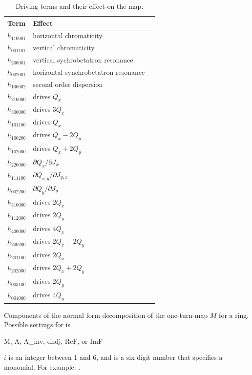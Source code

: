 \begin{description}
{\begin{table}[htb]
\centering
\begin{tabular}{lll}
  \toprule
  Term  & Effect \\
  \midrule
  $h_{110001}$  &  horizontal chromaticity \\
  $h_{001101}$  &  vertical chromaticity   \\
  $h_{200001}$  &  vertical sychrobetatron resonance    \\
  $h_{002001}$  &  horizontal synchrobetatron resonance \\
  $h_{100002}$  &  second order dispersion \\
  $h_{210000}$  &  drives $Q_x$            \\
  $h_{300000}$  &  drives $3Q_x$           \\
  $h_{101100}$  &  drives $Q_x$            \\
  $h_{100200}$  &  drives $Q_x-2Q_y$       \\
  $h_{102000}$  &  drives $Q_x+2Q_y$       \\
  $h_{220000}$  &  $\partial Q_x/\partial J_x$ \\
  $h_{111100}$  &  $\partial Q_{x,y}/\partial J_{y,x}$ \\
  $h_{002200}$  &  $\partial Q_y/\partial J_y$ \\
  $h_{310000}$  &  drives $2Q_x$  \\
  $h_{112000}$  &  drives $2Q_y$  \\
  $h_{400000}$  &  drives $4Q_x$  \\
  $h_{200200}$  &  drives $2Q_x-2Q_y$ \\
  $h_{201100}$  &  drives $2Q_x$ \\
  $h_{202000}$  &  drives $2Q_x+2Q_y$ \\
  $h_{003100}$  &  drives $2Q_y$ \\
  $h_{004000}$  &  drives $4Q_y$ \\
  \bottomrule
\end{tabular}
\caption[Common Driving Terms.]
{Driving terms and their effect on the map.}
\label{t:dts}
\end{table}



  \item[normal.<type>.$i$.<monomial>] \Newline
Components of the normal form decomposition of the one-turn-map $M$ for a ring. 
Possible settings for  is
\begin{example}
  M, A, A_inv, dhdj, ReF, or ImF
\end{example}      
$i$ is an integer between 1 and 6, and  is a six digit number that specifies
a monomial. For example: . 

}
\end{description}
